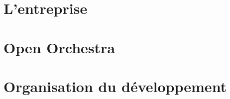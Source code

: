\documentclass[a4paper]{report}
\begin{document}
\newcommand{\HRule}{\rule{\linewidth}{0.5mm}}



~
\thispagestyle{empty}

% 


\tableofcontents
\thispagestyle{empty}
\setcounter{page}{0}

\renewcommand{\arraystretch}{1.5}


~
\thispagestyle{empty}
\setcounter{page}{0}
\newpage

\part{L'entreprise}

\part{Open Orchestra}

\part{Organisation du développement}

\newpage


\nocite{*}



\end{document}
